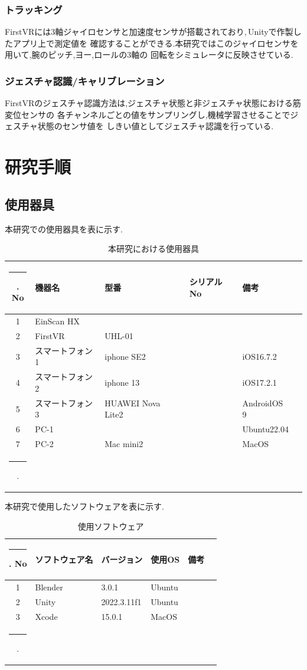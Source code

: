 \documentclass{ltjsreport}
\makeatletter
\def\Hline{
  \noalign{\ifnum0=`}\fi\hrule \@height 3.\arrayrulewidth \futurelet
  \reserved@a\@xhline}
\makeatother
\begin{document}
		\subsection{トラッキング}
			FirstVRには3軸ジャイロセンサと加速度センサが搭載されており,\,Unityで作製したアプリ上で測定値を
			確認することができる.本研究ではこのジャイロセンサを用いて,腕のピッチ,ヨー,ロールの3軸の
			回転をシミュレータに反映させている.
		\subsection{ジェスチャ認識/キャリブレーション}
			FirstVRのジェスチャ認識方法は,ジェスチャ状態と非ジェスチャ状態における筋変位センサの
			各チャンネルごとの値をサンプリングし,機械学習させることでジェスチャ状態のセンサ値を
			しきい値としてジェスチャ認識を行っている.

\chapter{研究手順}
	\section{使用器具}
		本研究での使用器具を表に示す.
	\begin{table}[H]
	\begin{center}
	\caption{本研究における使用器具}
	\label{tab:usedev}
	\begin{tabular}{clllll} \Hline
	No&\multicolumn{1}{l}{機器名}&\multicolumn{1}{l}{型番}&\multicolumn{1}{l}{シリアルNo}&\multicolumn{1}{l}{備考}\\ \hline
	1&EinScan HX&&&\\
	2&FirstVR&UHL-01&&\\
	3&スマートフォン1&iphone SE2&&iOS16.7.2\\
	4&スマートフォン2&iphone 13&&iOS17.2.1\\
	5&スマートフォン3&HUAWEI Nova Lite2&&AndroidOS 9\\
	6&PC-1&&&Ubuntu22.04\\
	7&PC-2&Mac mini2&&MacOS\\
	\Hline
	\end{tabular}
	\end{center}
	\end{table}
	本研究で使用したソフトウェアを表に示す.
	\begin{table}[H]
	\begin{center}
	\caption{使用ソフトウェア}
	\label{tab:usesoft}
	\begin{tabular}{clllll} \Hline
	No&\multicolumn{1}{l}{ソフトウェア名}&\multicolumn{1}{l}{バージョン}&\multicolumn{1}{l}{使用OS}&\multicolumn{1}{l}{備考}\\ \hline
	1&Blender&3.0.1&Ubuntu&\\
	2&Unity&2022.3.11f1&Ubuntu&\\
	3&Xcode&15.0.1&MacOS&\\
	\Hline
	\end{tabular}
	\end{center}
	\end{table}
\vspace{-15pt}
\end{document}
